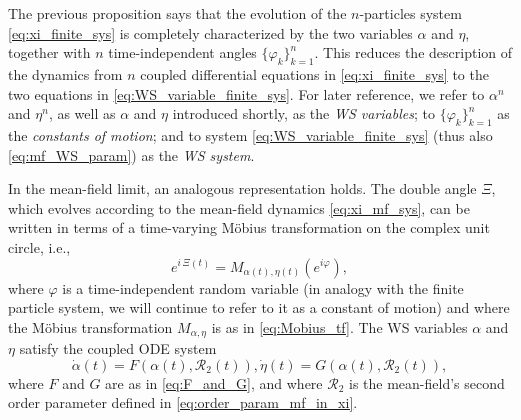 \documentclass[10pt]{article}
\theoremstyle{definition}
\theoremstyle{definition}
\numberwithin{equation}{section}
\newcommand{\CR}{\mathcal{R}}
\renewcommand{\S}{\mathbb{S}}
\begin{document}
The previous proposition says that the evolution of the $n$-particles system \eqref{eq:xi_finite_sys} is completely characterized by the two variables $\alpha$ and $\eta$, together with $n$ time-independent angles $\{\varphi_k\}_{k=1}^n$.
This reduces the description of the dynamics from $n$ coupled differential equations in \eqref{eq:xi_finite_sys} to the two equations in \eqref{eq:WS_variable_finite_sys}.
For later reference, we refer to $\alpha^n$ and $\eta^n$, as well as $\alpha$ and $\eta$ introduced shortly, as the \emph{WS variables}; to $\{\varphi_k\}_{k=1}^n$ as the \emph{constants of motion}; and to system \eqref{eq:WS_variable_finite_sys} (thus also \eqref{eq:mf_WS_param}) as the \emph{WS system}. 

In the mean-field limit, an analogous representation holds.
The double angle $\Xi$, which evolves according to the mean-field dynamics \eqref{eq:xi_mf_sys}, can be written in terms of a time-varying Möbius transformation on the complex unit circle, i.e.,
\begin{equation}\label{eq:action_of_M_mf_sys}
    e^{i \,\Xi (t)} = M_{\alpha(t), \eta(t)} \left( e^{i\varphi} \right),
\end{equation}
where $\varphi$ is a time-independent random variable (in analogy with the finite particle system, we will continue to refer to it as a constant of motion) and where the Möbius transformation $M_{\alpha, \eta}$ is as in \eqref{eq:Mobius_tf}.
The WS variables $\alpha$ and $\eta$ satisfy the coupled ODE system
\begin{subequations}\label{eq:mf_WS_param}
\begin{equation}\label{eq:alpha_dyn}
\dot{\alpha}(t) = F(\alpha(t), \CR_2(t)),
\end{equation}
\begin{equation}\label{eq:eta_dyn}
\dot{\eta}(t) = G(\alpha(t), \CR_2(t)) ,
\end{equation}
\end{subequations}
where $F$ and $G$ are as in \eqref{eq:F_and_G}, and where $\CR_2$ is the mean-field's second order parameter defined in \eqref{eq:order_param_mf_in_xi}.
\end{document}
